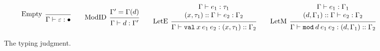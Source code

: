 \documentclass{article}
\theoremstyle{definition}
\newcommand*{\cons}{::}
\newcommand*{\modid}{d}
\newcommand*{\Lete}{\mathtt{val}}
\newcommand*{\Letm}{\mathtt{mod}}
\begin{document}
\begin{figure}[h!]
  \[
    \begin{prooftree}
      \infer[left label=Empty]0{
      \Gamma\vdash\varepsilon:\bullet
      }
    \end{prooftree}\qquad
    \begin{prooftree}
      \hypo{\Gamma'=\Gamma(\modid)}
      \infer[left label=ModID]1{
      \Gamma\vdash\modid:\Gamma'
      }
    \end{prooftree}\qquad
    \begin{prooftree}
      \hypo{
        \begin{matrix}
          \Gamma\vdash e_1:\tau_1 \\
          (x, \tau_1)\cons\Gamma\vdash e_2:\Gamma_2
        \end{matrix}
      }
      \infer[left label=LetE]1{
      \Gamma\vdash\Lete\:x\:e_1\:e_2:(x,\tau_1)\cons\Gamma_2
      }
    \end{prooftree}\qquad
    \begin{prooftree}
      \hypo{
        \begin{matrix}
          \Gamma\vdash e_1:\Gamma_1 \\
          (\modid, \Gamma_1)\cons\Gamma\vdash e_2:\Gamma_2
        \end{matrix}
      }
      \infer[left label=LetM]1{
      \Gamma\vdash\Letm\:\modid\:e_{1}\:e_{2}:(\modid,\Gamma_1)\cons\Gamma_2
      }
    \end{prooftree}
  \]
  \caption{The typing judgment.}
  \label{fig:typjudge}
\end{figure}
\end{document}
